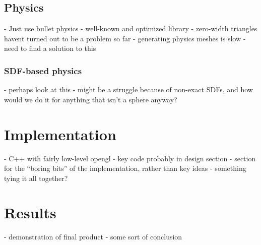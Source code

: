 \documentclass{article}
\begin{document}
 \subsection{Physics}
 - Just use bullet physics - well-known and optimized library
 - zero-width triangles havent turned out to be a problem so far
 - generating physics meshes is slow - need to find a solution to this
 \subsubsection{SDF-based physics}
 - perhaps look at this - might be a struggle because of non-exact SDFs, and how would we do it for anything that isn't a sphere anyway?
 
 \section{Implementation}
  - C++ with fairly low-level opengl
  - key code probably in design section
  - section for the ``boring bits'' of the implementation, rather than key ideas
  - something tying it all together?
  
\section{Results}
 - demonstration of final product
 - some sort of conclusion

\end{document}
